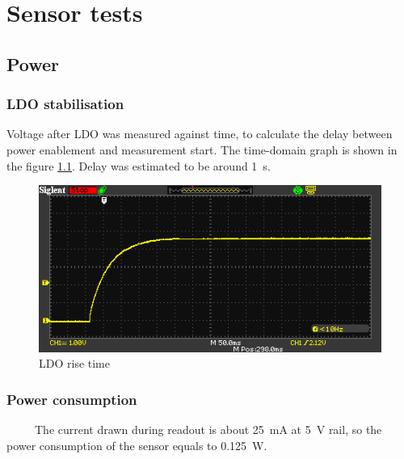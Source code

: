 \chapter{Sensor tests}


\section{Power}
    \subsection{LDO stabilisation}
        Voltage after LDO was measured against time, to calculate the delay between power enablement and measurement start. The time-domain graph is shown in the figure \ref{LDO_rise_time}. Delay was estimated to be around \SI{1}{\second}.

        \begin{figure}[H]
            \centering
            \includegraphics[width=0.8\paperwidth]{img/07/rise_time.png}
            \caption{LDO rise time}
            \label{LDO_rise_time}
        \end{figure}

    \subsection{Power consumption}
        The current drawn during readout is about \SI{25}{\milli\ampere} at \SI{5}{\volt} rail, so the power consumption of the sensor equals to \SI{0.125}{\watt}.

